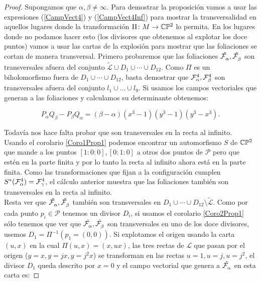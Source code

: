 \begin{proof}
Supongamos que $\alpha , \beta\neq\infty$. Para demostrar la proposición vamos a usar las expresiones (\ref{CampVect4}) y (\ref{CampVect4Inf}) para mostrar la transversalidad en aquellos lugares donde la transformación $\Pi\colon M\rightarrow \CP$ lo permita. En los lugares donde no podamos hacer esto (los divisores que obtenemos al explotar los doce puntos) vamos a usar las cartas de la explosión para mostrar que las foliaciones se cortan de manera transversal. Primero probaremos que las foliaciones $\tilde{\Fol{\alpha}},\tilde{\Fol{\beta}}$ son transversales afuera del conjunto $\tilde{\mathcal{L}}\cup D_{1}\cup\cdots\cup D_{12}$. Como $\Pi$ es un biholomorfismo fuera de $D_{1}\cup\cdots\cup D_{12}$, basta demostrar que $\Fol[4]{\alpha},\Fol[4]{\beta}$ son transversales afuera del conjunto $l_{1}\cup\ldots\cup l_{9}$. Si usamos los campos vectoriales que generan a las foliaciones y calculamos su determinante obtenemos:

\begin{equation*}
P_{\alpha}Q_{\beta}-P_{\beta}Q_{\alpha}=(\beta - \alpha)(x^{3}-1)(y^{3}-1)(y^{3}-x^{3}).
\end{equation*}

Todavía nos hace falta probar que son transversales en la recta al infinito. Usando  el corolario \ref{Coro1Prop1} podemos encontrar un automorfismo $S$ de $\CP$ que mande a los puntos $[1:0:0],[0:1:0]$ a otros dos puntos de $\mathcal{P}$ pero que estén en la parte finita y por lo tanto la recta al infinito ahora está en la parte finita. Como las transformaciones que fijan a la configuración cumplen $S^{*}(\Fol[4]{\alpha})=\Fol[4]{\gamma}$, el cálculo anterior muestra que las foliaciones también son transversales en la recta al infinito.\\

Resta ver que $\tilde{\Fol{\alpha}},\tilde{\Fol{\beta}}$ también son transversales en $D_{1}\cup\cdots\cup D_{12}\setminus\tilde{\mathcal{L}}$. Como por cada punto $p_{i}\in\mathcal{P}$ tenemos un divisor $D_{i}$, si usamos el corolario \ref{Coro2Prop1} sólo tenemos que ver que $\tilde{\Fol{\alpha}},\tilde{\Fol{\beta}}$ son transversales en uno de los doce divisores, usemos  $D_{1}=\Pi^{-1}(p_{1}=(0,0))$. Si explotamos el origen usando la carta $(u,x)$ en la cual  $\Pi(u,x)=(x,ux)$, las tres rectas de $\mathcal{L}$ que pasan por el origen ($y=x,y=jx,y=j^{2}x$) se transforman en las rectas $u=1,u=j,u=j^{2}$, el divisor $D_{1}$ queda descrito por $x=0$ y el campo vectorial que genera a $\tilde{\Fol{\alpha}}$ en esta carta es:


\end{proof}
